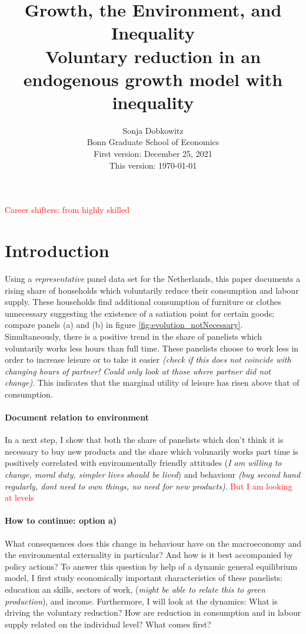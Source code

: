 \documentclass[12pt]{article}
\title{Growth, the Environment, and Inequality\\ \small{ Voluntary reduction in an endogenous growth model with inequality}}
\date{Sonja Dobkowitz\\ Bonn Graduate School of Economics\\ %
	\vspace{1mm}
	First version: December 25, 2021\\
	This version: \today }
\newcommand{\tr}[1]{\textcolor{red}{#1}}
\begin{document}
	\maketitle

\tr{Career shifters: from highly skilled}	
\section{Introduction}

Using a \textit{representative} panel data set for the Netherlands, this paper documents a rising share of households which voluntarily reduce their consumption and labour supply. These households find additional consumption of furniture or clothes unnecessary suggesting the existence of a satiation point for certain goods; compare panels (a) and (b) in figure \ref{fig:evolution_notNecessary}. Simultaneously, there is a positive trend in the share of panelists which voluntarily works less hours than full time. These panelists choose to work less in order to increase leisure or to take it easier \textit{(check if this does not coincide with changing hours of partner! Could only look at those where partner did not change)}. This indicates that the marginal utility of leisure  has risen above that of consumption. 

\paragraph{Document relation to environment}
In a next step, I show that both the share of panelists which don't think it is necessary to buy new products and the share which volunarily works part time is positively correlated with environmentally friendly attitudes (\textit{I am willing to change, moral duty, simpler lives should be lived}) and behaviour \textit{(buy second hand regularly, dont need to own things, no need for new products)}. \tr{But I am looking at levels}

\paragraph{How to continue: option a)}
What consequences does this change in behaviour have on the macroeconomy and the environmental externality in particular? And how is it best accompanied by policy actions?
To answer this question by help of a dynamic general equilibrium model, I first study economically important characteristics of these panelists: education an skills, sectors of work, (\textit{might be able to relate this to green production}), and income. 
Furthermore, I will look at the dynamics: 
What is driving the voluntary reduction? How are reduction in consumption and in labour supply related on the individual level?  What comes first?
\end{document}

